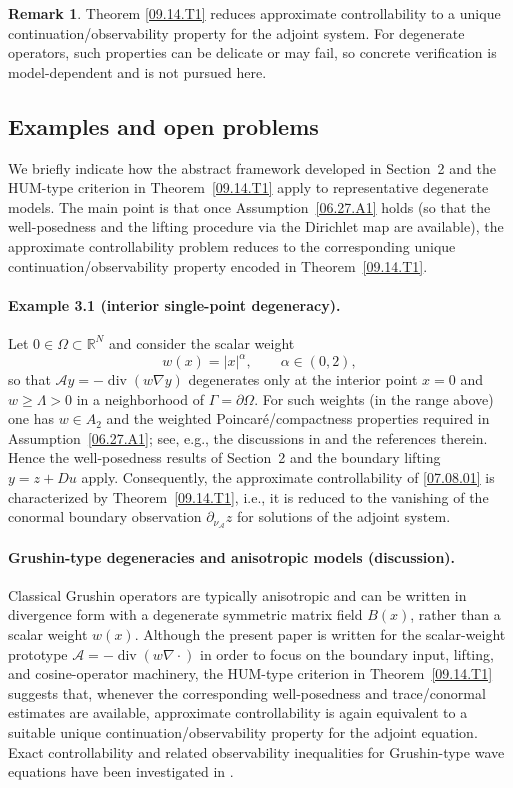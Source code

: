 \documentclass[preprint,12pt]{elsarticle}
\theoremstyle{definition}   %
\newtheorem{remark}[theorem]{Remark}
\numberwithin{equation}{section}
\DeclareMathOperator{\Div}{div}
\begin{document}
\begin{remark}
Theorem \ref{09.14.T1} reduces approximate controllability to a unique continuation/observability property for the adjoint system. For degenerate operators, such properties can be delicate or may fail, so concrete verification is model-dependent and is not pursued here.
\end{remark}

\subsection*{Examples and open problems}
\label{subsec:examples}

We briefly indicate how the abstract framework developed in Section~2 and the HUM-type criterion in Theorem~\ref{09.14.T1} apply to representative degenerate models. The main point is that once Assumption~\ref{06.27.A1} holds (so that the well-posedness and the lifting procedure via the Dirichlet map are available), the approximate controllability problem reduces to the corresponding unique continuation/observability property encoded in Theorem~\ref{09.14.T1}.

\paragraph{Example 3.1 (interior single-point degeneracy).}
Let $0\in\Omega\subset\mathbb{R}^N$ and consider the scalar weight
\[
w(x)=|x|^{\alpha}, \qquad \alpha\in(0,2),
\]
so that $\mathcal{A}y=-\Div(w\nabla y)$ degenerates only at the interior point $x=0$ and $w\ge \Lambda>0$ in a neighborhood of $\Gamma=\partial\Omega$.
For such weights (in the range above) one has $w\in A_2$ and the weighted Poincar\'e/compactness properties required in Assumption~\ref{06.27.A1}; see, e.g., the discussions in \cite{Yang1} and the references therein. Hence the well-posedness results of Section~2 and the boundary lifting $y=z+Du$ apply.
Consequently, the approximate controllability of \eqref{07.08.01} is characterized by Theorem~\ref{09.14.T1}, i.e., it is reduced to the vanishing of the conormal boundary observation $\partial_{\nu_{\mathcal A}}z$ for solutions of the adjoint system.

\paragraph{Grushin-type degeneracies and anisotropic models (discussion).}
Classical Grushin operators are typically anisotropic and can be written in divergence form with a degenerate symmetric matrix field $B(x)$, rather than a scalar weight $w(x)$.
Although the present paper is written for the scalar-weight prototype $\mathcal{A}=-\Div(w\nabla\cdot)$ in order to focus on the boundary input, lifting, and cosine-operator machinery, the HUM-type criterion in Theorem~\ref{09.14.T1} suggests that, whenever the corresponding well-posedness and trace/conormal estimates are available, approximate controllability is again equivalent to a suitable unique continuation/observability property for the adjoint equation.
Exact controllability and related observability inequalities for Grushin-type wave equations have been investigated in \cite{Yang}.
\end{document}
